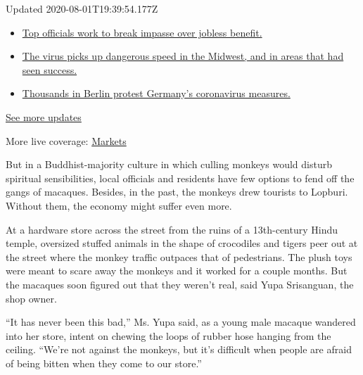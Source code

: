 Updated 2020-08-01T19:39:54.177Z

\begin{itemize}
\tightlist
\item
  \href{https://www.nytimes3xbfgragh.onion/2020/08/01/world/coronavirus-covid-19.html?action=click\&pgtype=Article\&state=default\&region=MAIN_CONTENT_1\&context=storylines_live_updates\#link-3ac56579}{Top
  officials work to break impasse over jobless benefit.}
\item
  \href{https://www.nytimes3xbfgragh.onion/2020/08/01/world/coronavirus-covid-19.html?action=click\&pgtype=Article\&state=default\&region=MAIN_CONTENT_1\&context=storylines_live_updates\#link-8796723}{The
  virus picks up dangerous speed in the Midwest, and in areas that had
  seen success.}
\item
  \href{https://www.nytimes3xbfgragh.onion/2020/08/01/world/coronavirus-covid-19.html?action=click\&pgtype=Article\&state=default\&region=MAIN_CONTENT_1\&context=storylines_live_updates\#link-25930521}{Thousands
  in Berlin protest Germany's coronavirus measures.}
\end{itemize}

\href{https://www.nytimes3xbfgragh.onion/2020/08/01/world/coronavirus-covid-19.html?action=click\&pgtype=Article\&state=default\&region=MAIN_CONTENT_1\&context=storylines_live_updates}{See
more updates}

More live coverage:
\href{https://www.nytimes3xbfgragh.onion/live/2020/07/31/business/stock-market-today-coronavirus?action=click\&pgtype=Article\&state=default\&region=MAIN_CONTENT_1\&context=storylines_live_updates}{Markets}

But in a Buddhist-majority culture in which culling monkeys would
disturb spiritual sensibilities, local officials and residents have few
options to fend off the gangs of macaques. Besides, in the past, the
monkeys drew tourists to Lopburi. Without them, the economy might suffer
even more.

At a hardware store across the street from the ruins of a 13th-century
Hindu temple, oversized stuffed animals in the shape of crocodiles and
tigers peer out at the street where the monkey traffic outpaces that of
pedestrians. The plush toys were meant to scare away the monkeys and it
worked for a couple months. But the macaques soon figured out that they
weren't real, said Yupa Srisanguan, the shop owner.

``It has never been this bad,'' Ms. Yupa said, as a young male macaque
wandered into her store, intent on chewing the loops of rubber hose
hanging from the ceiling. ``We're not against the monkeys, but it's
difficult when people are afraid of being bitten when they come to our
store.''

